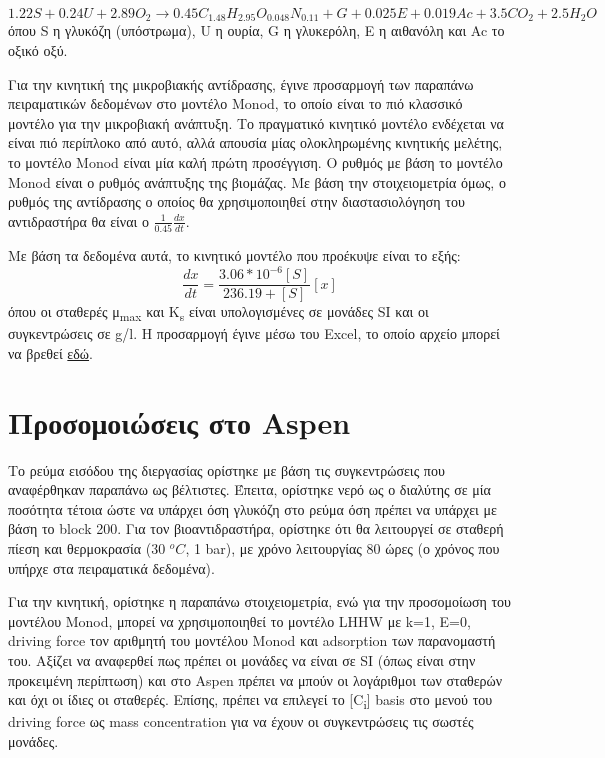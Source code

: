 \documentclass[11pt]{article}
\begin{document}
\[ 1.22 S + 0.24U + 2.89 O_2 \rightarrow 0.45 C_{1.48}H_{2.95}O_{0.048}N_{0.11} + G + 0.025E + 0.019Ac + 3.5CO_2 + 2.5H_2O \]
όπου S η γλυκόζη (υπόστρωμα), U η ουρία, G η γλυκερόλη, Ε η αιθανόλη και Ac το οξικό οξύ.

Για την κινητική της μικροβιακής αντίδρασης, έγινε προσαρμογή των παραπάνω πειραματικών δεδομένων στο μοντέλο Monod, το οποίο είναι το πιό κλασσικό μοντέλο για την μικροβιακή ανάπτυξη. Το πραγματικό κινητικό μοντέλο ενδέχεται να είναι πιό περίπλοκο από αυτό, αλλά απουσία μίας ολοκληρωμένης κινητικής μελέτης, το μοντέλο Monod είναι μία καλή πρώτη προσέγγιση. Ο ρυθμός με βάση το μοντέλο Monod είναι ο ρυθμός ανάπτυξης της βιομάζας. Με βάση την στοιχειομετρία όμως, ο ρυθμός της αντίδρασης ο οποίος θα χρησιμοποιηθεί στην διαστασιολόγηση του αντιδραστήρα θα είναι ο \(\frac{1}{0.45} \frac{dx}{dt}\).

Με βάση τα δεδομένα αυτά, το κινητικό μοντέλο που προέκυψε είναι το εξής:
\[ \frac{dx}{dt} = \frac{3.06*10^{-6}[S]}{236.19+[S]}[x] \] όπου οι σταθερές μ\textsubscript{max} και K\textsubscript{s} είναι υπολογισμένες σε μονάδες SI και οι συγκεντρώσεις σε g/l. Η προσαρμογή έγινε μέσω του Excel, το οποίο αρχείο μπορεί να βρεθεί \href{https://github.com/Vidianos-Giannitsis/Process-Design/blob/master/Calculations/c\_glycerinogenes\_kinetics.ods}{εδώ}.

\section{Προσομοιώσεις στο Aspen}
\label{sec:org60f2c86}
Το ρεύμα εισόδου της διεργασίας ορίστηκε με βάση τις συγκεντρώσεις που αναφέρθηκαν παραπάνω ως βέλτιστες. Έπειτα, ορίστηκε νερό ως ο διαλύτης σε μία ποσότητα τέτοια ώστε να υπάρχει όση γλυκόζη στο ρεύμα όση πρέπει να υπάρχει με βάση το block 200. Για τον βιοαντιδραστήρα, ορίστηκε ότι θα λειτουργεί σε σταθερή πίεση και θερμοκρασία (30 \(^oC\), 1 bar), με χρόνο λειτουργίας 80 ώρες (ο χρόνος που υπήρχε στα πειραματικά δεδομένα).

Για την κινητική, ορίστηκε η παραπάνω στοιχειομετρία, ενώ για την προσομοίωση του μοντέλου Monod, μπορεί να χρησιμοποιηθεί το μοντέλο LHHW με k=1, E=0, driving force τον αριθμητή του μοντέλου Monod και adsorption των παρανομαστή του. Αξίζει να αναφερθεί πως πρέπει οι μονάδες να είναι σε SI (όπως είναι στην προκειμένη περίπτωση) και στο Aspen πρέπει να μπούν οι λογάριθμοι των σταθερών και όχι οι ίδιες οι σταθερές. Επίσης, πρέπει να επιλεγεί το [C\textsubscript{i}] basis στο μενού του driving force ως mass concentration για να έχουν οι συγκεντρώσεις τις σωστές μονάδες.
\end{document}
